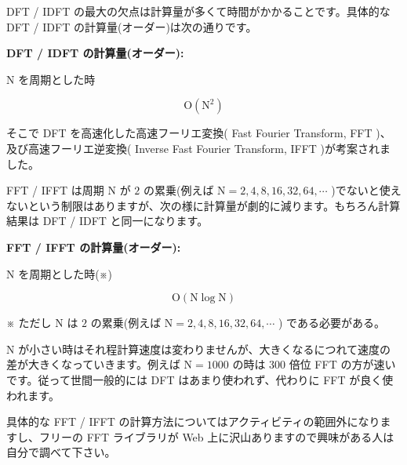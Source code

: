 \documentclass[a4paper]{jarticle}
\begin{document}

\bigskip
DFT / IDFT の最大の欠点は計算量が多くて時間がかかることです。具体的な DFT / IDFT の計算量(オーダー)は次の通りです。

\begin{framed}
\noindent\quad \textbf{DFT / IDFT の計算量(オーダー):}

\bigskip
$\textrm{N}$ を周期とした時

\[
\textrm{O}(\textrm{N}^2)
\]
\end{framed}

\medskip
そこで DFT を高速化した高速フーリエ変換( Fast Fourier Transform, FFT )、及び高速フーリエ逆変換( Inverse Fast Fourier Transform, IFFT )が考案されました。

\medskip
FFT / IFFT は周期 $\textrm{N}$ が $2$ の累乗(例えば $\textrm{N} = 2, 4, 8, 16, 32, 64, \cdots$ )でないと使えないという制限はありますが、次の様に計算量が劇的に減ります。もちろん計算結果は DFT / IDFT と同一になります。

\begin{framed}
\noindent\quad \textbf{FFT / IFFT の計算量(オーダー):}

\bigskip
$\textrm{N}$ を周期とした時(※)

\[
\textrm{O}(\textrm{N}\log\textrm{N})
\]

\bigskip
\noindent ※ ただし $\textrm{N}$ は $2$ の累乗(例えば $\textrm{N} = 2, 4, 8, 16, 32, 64, \cdots$ ) である必要がある。
\end{framed}

\medskip
$\textrm{N}$ が小さい時はそれ程計算速度は変わりませんが、大きくなるにつれて速度の差が大きくなっていきます。例えば $\textrm{N} = 1000$ の時は $300$ 倍位 FFT の方が速いです。従って世間一般的には DFT はあまり使われず、代わりに FFT が良く使われます。

\medskip
具体的な FFT / IFFT の計算方法についてはアクティビティの範囲外になりますし、フリーの FFT ライブラリが Web 上に沢山ありますので興味がある人は自分で調べて下さい。
\end{document}
